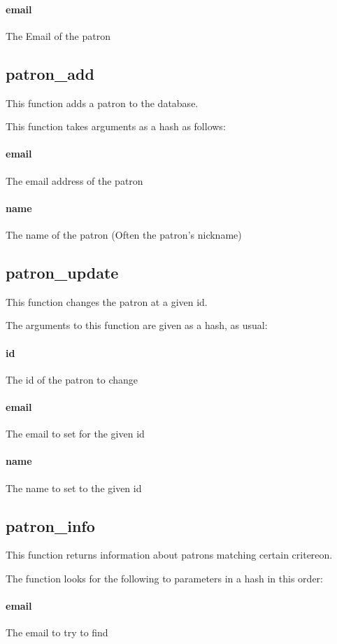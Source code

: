 \documentclass[12pt,titlepage]{article}
\begin{document}
\paragraph{email}
The Email of the patron

\subsection{patron_add}
This function adds a patron to the database.

This function takes arguments as a hash as follows:
\paragraph{email}
The email address of the patron 

\paragraph{name}
The name of the patron (Often the patron's nickname)

\subsection{patron_update}
This function changes the patron at a given id.

The arguments to this function are given as a hash, as usual:
\paragraph{id}
The id of the patron to change 

\paragraph{email}
The email to set for the given id 

\paragraph{name}
The name to set to the given id

\subsection{patron_info}
This function returns information about patrons matching certain critereon.

The function looks for the following to parameters in a hash in this order:
\paragraph{email}
The email to try to find 
\end{document}
